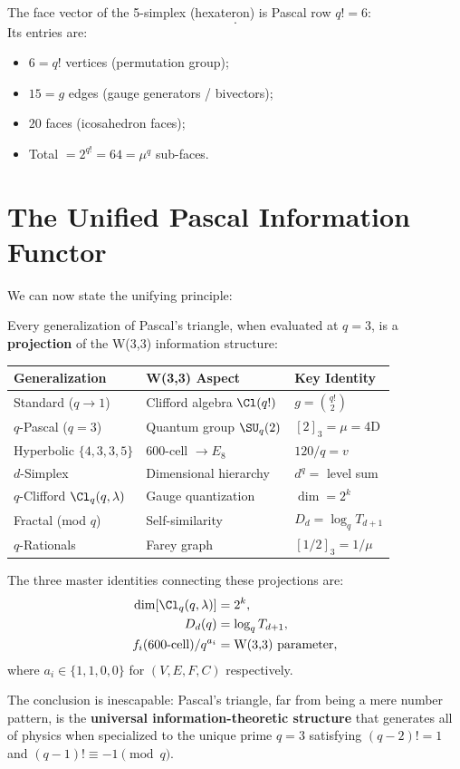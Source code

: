 \begin{theorem}[The $d=q!{-}1=5$ Simplex Encodes the Standard Model]
The face vector of the 5-simplex (hexateron) is Pascal row $q!=6$:
\begin{equation}
[1,\; 6,\; 15,\; 20,\; 15,\; 6,\; 1].
\end{equation}
Its entries are:
\begin{itemize}[nosep]
\item $6 = q!$ vertices (permutation group);
\item $15 = g$ edges (gauge generators / bivectors);
\item $20$ faces (icosahedron faces);
\item Total $= 2^{q!} = 64 = \mu^q$ sub-faces.
\end{itemize}
\end{theorem}


\section{The Unified Pascal Information Functor}
\label{sec:pascal-functor}

We can now state the unifying principle:

\begin{theorem}
\label{thm:pascal-functor}
Every generalization of Pascal's triangle, when evaluated at $q=3$,
is a \textbf{projection} of the W(3,3) information structure:
\begin{center}
\renewcommand{\arraystretch}{1.3}
\begin{tabular}{@{}lll@{}}
\toprule
\textbf{Generalization} & \textbf{W(3,3) Aspect} & \textbf{Key Identity} \\
\midrule
Standard ($q\to 1$) & Clifford algebra $\Cl(q!)$ & $g = \binom{q!}{2}$ \\
$q$-Pascal ($q=3$) & Quantum group $\SU_q(2)$ & $[2]_3 = \mu = 4\mathrm{D}$ \\
Hyperbolic $\{4,3,3,5\}$ & 600-cell $\to E_8$ & $120/q = v$ \\
$d$-Simplex & Dimensional hierarchy & $d^q = $ level sum \\
$q$-Clifford $\Cl_q(q,\lambda)$ & Gauge quantization & $\dim = 2^k$ \\
Fractal (mod $q$) & Self-similarity & $D_d = \log_q T_{d+1}$ \\
$q$-Rationals & Farey graph & $[1/2]_3 = 1/\mu$ \\
\bottomrule
\end{tabular}
\end{center}
The three master identities connecting these projections are:
\begin{align}
\dim[\Cl_q(q,\lambda)] &= 2^k, \label{eq:master1} \\
D_d(q) &= \log_q T_{d+1}, \label{eq:master2} \\
f_i(\text{600-cell}) / q^{a_i} &= \text{W(3,3) parameter}, \label{eq:master3}
\end{align}
where $a_i \in \{1, 1, 0, 0\}$ for $(V,E,F,C)$ respectively.
\end{theorem}

The conclusion is inescapable: Pascal's triangle, far from being
a mere number pattern, is the \textbf{universal information-theoretic
structure} that generates all of physics when specialized to the
unique prime $q=3$ satisfying $(q{-}2)!=1$ and $(q{-}1)!\equiv -1\pmod{q}$.

